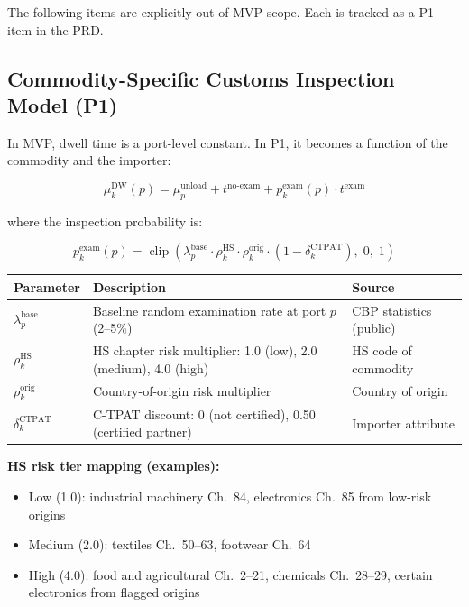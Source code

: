 \documentclass[11pt,a4paper]{article}
\theoremstyle{definition}
\begin{document}
The following items are explicitly out of MVP scope. Each is tracked as a P1 item in
the PRD.

\subsection{Commodity-Specific Customs Inspection Model (P1)}
\label{sec:p1-customs}

In MVP, dwell time is a port-level constant. In P1, it becomes a function of the
commodity and the importer:

\[
  \mu_k^{\text{DW}}(p) = \mu_p^{\text{unload}} + t^{\text{no-exam}} + p_k^{\text{exam}}(p) \cdot t^{\text{exam}}
\]

where the inspection probability is:

\[
  p_k^{\text{exam}}(p) = \operatorname{clip}\!\left(
    \lambda_p^{\text{base}} \cdot \rho_k^{\text{HS}} \cdot \rho_k^{\text{orig}} \cdot
    (1 - \delta_k^{\text{CTPAT}}),\; 0,\; 1
  \right)
\]

\begin{center}
\begin{tabular}{lll}
\toprule
Parameter & Description & Source \\
\midrule
$\lambda_p^{\text{base}}$ & Baseline random examination rate at port $p$ (2--5\%) & CBP statistics (public) \\
$\rho_k^{\text{HS}}$ & HS chapter risk multiplier: 1.0 (low), 2.0 (medium), 4.0 (high) & HS code of commodity \\
$\rho_k^{\text{orig}}$ & Country-of-origin risk multiplier & Country of origin \\
$\delta_k^{\text{CTPAT}}$ & C-TPAT discount: 0 (not certified), 0.50 (certified partner) & Importer attribute \\
\bottomrule
\end{tabular}
\end{center}

\textbf{HS risk tier mapping (examples):}
\begin{itemize}[noitemsep]
  \item Low (1.0): industrial machinery Ch.\ 84, electronics Ch.\ 85 from low-risk origins
  \item Medium (2.0): textiles Ch.\ 50--63, footwear Ch.\ 64
  \item High (4.0): food and agricultural Ch.\ 2--21, chemicals Ch.\ 28--29, certain
        electronics from flagged origins
\end{itemize}
\end{document}
